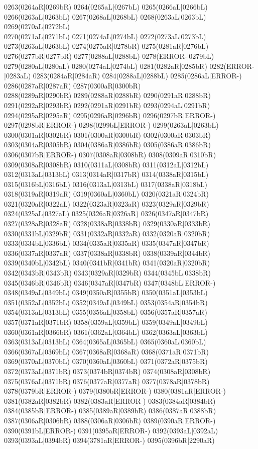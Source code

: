 0263(0264aR|0269bR) 0264(0265aL|0267bL) 0265(0266aL|0266bL) 0266(0263aL|0263bL) 0267(0268aL|0268bL) 0268(0263aL|0263bL) 0269(0270aL|0272bL) \\0270(0271aL|0271bL) 0271(0274aL|0274bL) 0272(0273aL|0273bL) 0273(0263aL|0263bL) 0274(0275aR|0278bR) 0275(0281aR|0276bL) 0276(0277bR|0277bR) 0277(0288aL|0288bL) 0278(ERROR-|0279bL) \\0279(0280aL|0280aL) 0280(0274aL|0274bL) 0281(0282aR|0285bR) 0282(ERROR-|0283aL) 0283(0284aR|0284aR) 0284(0288aL|0288bL) 0285(0286aL|ERROR-) 0286(0287aR|0287aR) 0287(0300aR|0300bR) \\0288(0289aR|0290bR) 0289(0288aR|0288bR) 0290(0291aR|0288bR) 0291(0292aR|0293bR) 0292(0291aR|0291bR) 0293(0294aL|0291bR) 0294(0295aR|0295aR) 0295(0296aR|0296bR) 0296(0297bR|ERROR-) \\0297(0298bR|ERROR-) 0298(0299bL|ERROR-) 0299(0263aL|0263bL) 0300(0301aR|0302bR) 0301(0300aR|0300bR) 0302(0300aR|0303bR) 0303(0304aR|0305bR) 0304(0386aR|0386bR) 0305(0386aR|0386bR) \\0306(0307bR|ERROR-) 0307(0308aR|0308bR) 0308(0309aR|0310bR) 0309(0308aR|0308bR) 0310(0311aL|0308bR) 0311(0312aL|0312bL) 0312(0313aL|0313bL) 0313(0314aR|0317bR) 0314(0338aR|0315bL) \\0315(0316bL|0316bL) 0316(0313aL|0313bL) 0317(0338aR|0318bL) 0318(0319aR|0319aR) 0319(0360aL|0360bL) 0320(0321aR|0324bR) 0321(0320aR|0322aL) 0322(0323aR|0323aR) 0323(0329aR|0329bR) \\0324(0325aL|0327aL) 0325(0326aR|0326aR) 0326(0347aR|0347bR) 0327(0328aR|0328aR) 0328(0338aR|0338bR) 0329(0330aR|0333bR) 0330(0331bL|0329bR) 0331(0332aR|0332aR) 0332(0320aR|0320bR) \\0333(0334bL|0336bL) 0334(0335aR|0335aR) 0335(0347aR|0347bR) 0336(0337aR|0337aR) 0337(0338aR|0338bR) 0338(0339aR|0344bR) 0339(0340bL|0342bL) 0340(0341bR|0341bR) 0341(0320aR|0320bR) \\0342(0343bR|0343bR) 0343(0329aR|0329bR) 0344(0345bL|0338bR) 0345(0346bR|0346bR) 0346(0347aR|0347bR) 0347(0348bL|ERROR-) 0348(0349aL|0349bL) 0349(0350aR|0355bR) 0350(0351aL|0353bL) \\0351(0352aL|0352bL) 0352(0349aL|0349bL) 0353(0354aR|0354bR) 0354(0313aL|0313bL) 0355(0356aL|0358bL) 0356(0357aR|0357aR) 0357(0371aR|0371bR) 0358(0359aL|0359bL) 0359(0349aL|0349bL) \\0360(0361aR|0366bR) 0361(0362aL|0364bL) 0362(0363aL|0363bL) 0363(0313aL|0313bL) 0364(0365aL|0365bL) 0365(0360aL|0360bL) 0366(0367aL|0369bL) 0367(0368aR|0368aR) 0368(0371aR|0371bR) \\0369(0370aL|0370bL) 0370(0360aL|0360bL) 0371(0372aR|0375bR) 0372(0373aL|0371bR) 0373(0374bR|0374bR) 0374(0308aR|0308bR) 0375(0376aL|0371bR) 0376(0377aR|0377aR) 0377(0378aR|0378bR) \\0378(0379bR|ERROR-) 0379(0380bR|ERROR-) 0380(0381aR|ERROR-) 0381(0382aR|0382bR) 0382(0383aR|ERROR-) 0383(0384aR|0384bR) 0384(0385bR|ERROR-) 0385(0389aR|0389bR) 0386(0387aR|0388bR) \\0387(0306aR|0306bR) 0388(0306aR|0306bR) 0389(0390aR|ERROR-) 0390(0391bL|ERROR-) 0391(0395aR|ERROR-) 0392(0393aL|0392aL) 0393(0393aL|0394bR) 0394(3781aR|ERROR-) 0395(0396bR|2290aR) 